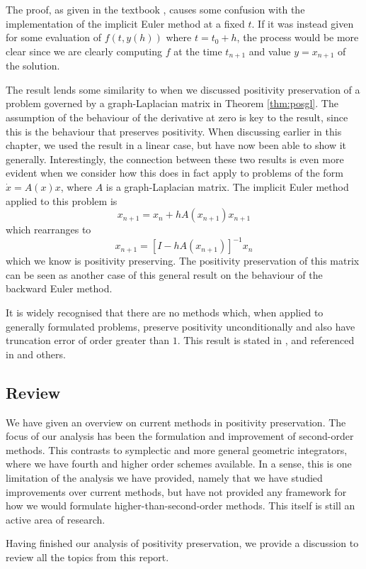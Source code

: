 The proof, as given in the textbook \cite{hundsdorfer2003numerical}, causes some confusion with the implementation of the implicit Euler method at a fixed $t$.
If it was instead given for some evaluation of $f(t,y(h))$ where $t = t_0 + h$, the process would be more clear since we are clearly computing $f$ at the time $t_{n+1}$ and value $y = x_{n+1}$ of the solution.

The result lends some similarity to when we discussed positivity preservation of a problem governed by a graph-Laplacian matrix in Theorem \ref{thm:posgl}.
The assumption of the behaviour of the derivative at zero is key to the result, since this is the behaviour that preserves positivity.
When discussing earlier in this chapter, we used the result in a linear case, but have now been able to show it generally.
Interestingly, the connection between these two results is even more evident when we consider how this does in fact apply to problems of the form $\dot{x} = A(x)x$,
where $A$ is a graph-Laplacian matrix.
The implicit Euler method applied to this problem is 
\begin{equation*}
    x_{n+1} = x_n + h A(x_{n+1})x_{n+1}
\end{equation*}
which rearranges to
\begin{equation*}
    x_{n+1} = \left[
        I - h A(x_{n+1})
    \right]^{-1}x_n
\end{equation*}
which we know is positivity preserving.
The positivity preservation of this matrix can be seen as another case of this general result on the behaviour of the backward Euler method.

It is widely recognised that there are no methods which, when applied to generally formulated problems, preserve positivity unconditionally and also have truncation error of order greater than $1$.
This result is stated in \cite{bolley1978conservation}, and referenced in \cite{blanes_pos_2022, hundsdorfer2003numerical} and others. 

\subsection{Review}

We have given an overview on current methods in positivity preservation.
The focus of our analysis has been the formulation and improvement of second-order methods.
This contrasts to symplectic and more general geometric integrators,
where we have fourth and higher order schemes available.
In a sense, this is one limitation of the analysis we have provided,
namely that we have studied improvements over current methods,
but have not provided any framework for how we would formulate higher-than-second-order methods.
This itself is still an active area of research.

Having finished our analysis of positivity preservation, we provide a discussion to review all the topics from this report.
